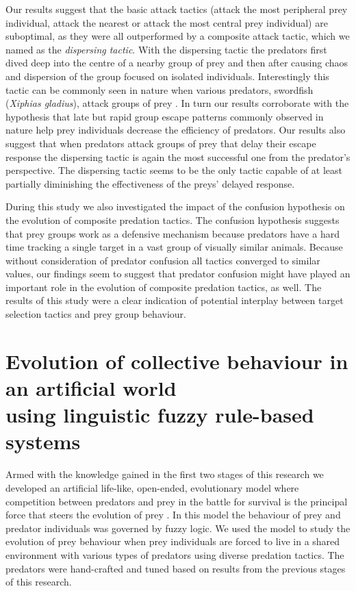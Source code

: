Our results suggest that the basic attack tactics (attack the most peripheral prey individual, attack the nearest or attack the most central prey individual) are suboptimal, as they were all outperformed by a composite attack tactic, which we named as the \emph{dispersing tactic}. With the dispersing tactic the predators first dived deep into the centre of a nearby group of prey and then after causing chaos and dispersion of the group focused on isolated individuals. Interestingly this tactic can be commonly seen in nature when various predators, \eg swordfish (\emph{Xiphias gladius}), attack groups of prey \cite{larsson2012why,pavlov2000patterns}. In turn our results corroborate with the hypothesis that late but rapid group escape patterns commonly observed in nature \cite{partridge1982structure} help prey individuals decrease the efficiency of predators. Our results also suggest that when predators attack groups of prey that delay their escape response the dispersing tactic is again the most successful one from the predator's perspective. The dispersing tactic seems to be the only tactic capable of at least partially diminishing the effectiveness of the preys' delayed response.

During this study we also investigated the impact of the confusion hypothesis on the evolution of composite predation tactics. The confusion hypothesis suggests that prey groups work as a defensive mechanism because predators have a hard time tracking a single target in a vast group of visually similar animals. Because without consideration of predator confusion all tactics converged to similar values, our findings seem to suggest that predator confusion might have played an important role in the evolution of composite predation tactics, as well. The results of this study were a clear indication of potential interplay between target selection tactics and prey group behaviour.

\section{Evolution of collective behaviour in an artificial world\\ using linguistic fuzzy rule-based systems}

Armed with the knowledge gained in the first two stages of this research we developed an artificial life-like, open-ended, evolutionary model where competition between predators and prey in the battle for survival is the principal force that steers the evolution of prey \cite{demsar2017evolution}. In this model the behaviour of prey and predator individuals was governed by fuzzy logic. We used the model to study the evolution of prey behaviour when prey individuals are forced to live in a shared environment with various types of predators using diverse predation tactics. The predators were hand-crafted and tuned based on results from the previous stages of this research.

